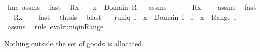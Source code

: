 \begin{isabellebody}
\ lm{}{}c\ assms\ \isamarkupfalse%
\ fast\isanewline
{}\isamarkupfalse%
%
\endisatagproof
{\isafoldproof}%
%
\isadelimproof
\isanewline
%
\endisadelimproof
\isanewline
{}\isamarkupfalse%
\ \ {\isachardoublequoteopen}R{\isacharcomma}{\isacharcomma}{\isacharcomma}x\ {\isasymnoteq}\ {\isacharbraceleft}{\isacharbraceright}{\isachardoublequoteclose}\ \ {\isachardoublequoteopen}x\ {\isasymin}\ Domain\ R{\isachardoublequoteclose}%
\isadelimproof
\ %
\endisadelimproof
%
\isatagproof
{}\isamarkupfalse%
\ assms\ \ \isanewline
{}\isamarkupfalse%
\ {\isacharminus}\ \isamarkupfalse%
\ {\isachardoublequoteopen}{\isasymUnion}\ {\isacharparenleft}R{\isacharbackquote}{\isacharbackquote}{\isacharbraceleft}x{\isacharbraceright}{\isacharparenright}\ {\isasymnoteq}\ {\isacharbraceleft}{\isacharbraceright}{\isachardoublequoteclose}\ \isamarkupfalse%
\ assms{\isacharparenleft}{}{\isacharparenright}\ \isamarkupfalse%
\ fast\isanewline
{}\isamarkupfalse%
\ \isamarkupfalse%
\ {\isachardoublequoteopen}R{\isacharbackquote}{\isacharbackquote}{\isacharbraceleft}x{\isacharbraceright}\ {\isasymnoteq}\ {\isacharbraceleft}{\isacharbraceright}{\isachardoublequoteclose}\ \isamarkupfalse%
\ fast\ \isamarkupfalse%
\ {\isacharquery}thesis\ \isamarkupfalse%
\ blast\ \isamarkupfalse%
%
\endisatagproof
{\isafoldproof}%
%
\isadelimproof
%
\endisadelimproof
\isanewline
\isanewline
{}\isamarkupfalse%
\ \ {\isachardoublequoteopen}runiq\ f{\isachardoublequoteclose}\ \ {\isachardoublequoteopen}x\ {\isasymin}\ Domain\ f{\isachardoublequoteclose}\ \ {\isachardoublequoteopen}{\isacharparenleft}f\ {\isacharcomma}{\isacharcomma}\ x{\isacharparenright}\ {\isasymin}\ Range\ f{\isachardoublequoteclose}%
\isadelimproof
\ %
\endisadelimproof
%
\isatagproof
{}\isamarkupfalse%
\ assms\ \isanewline
{}\isamarkupfalse%
\ {\isacharparenleft}rule\ eval{\isacharunderscore}runiq{\isacharunderscore}in{\isacharunderscore}Range{\isacharparenright}%
\endisatagproof
{\isafoldproof}%
%
\isadelimproof
%
\endisadelimproof
%
\begin{isamarkuptext}%
Nothing outside the set of goods is allocated.%
\end{isamarkuptext}%
\isamarkuptrue%
\isamarkupfalse%

\end{isabellebody}
